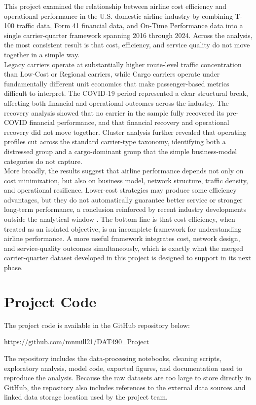 \documentclass[11pt, letterpaper]{article}
\begin{document}
This project examined the relationship between airline cost efficiency and operational performance in the U.S. domestic airline industry by combining T-100 traffic data, Form 41 financial data, and On-Time Performance data into a single carrier-quarter framework spanning 2016 through 2024. Across the analysis, the most consistent result is that cost, efficiency, and service quality do not move together in a simple way.\\
\indent Legacy carriers operate at substantially higher route-level traffic concentration than Low-Cost or Regional carriers, while Cargo carriers operate under fundamentally different unit economics that make passenger-based metrics difficult to interpret. The COVID-19 period represented a clear structural break, affecting both financial and operational outcomes across the industry. The recovery analysis showed that no carrier in the sample fully recovered its pre-COVID financial performance, and that financial recovery and operational recovery did not move together. Cluster analysis further revealed that operating profiles cut across the standard carrier-type taxonomy, identifying both a distressed group and a cargo-dominant group that the simple business-model categories do not capture.\\
\indent More broadly, the results suggest that airline performance depends not only on cost minimization, but also on business model, network structure, traffic density, and operational resilience. Lower-cost strategies may produce some efficiency advantages, but they do not automatically guarantee better service or stronger long-term performance, a conclusion reinforced by recent industry developments outside the analytical window \cite{spirit_shutdown2026}. The bottom line is that cost efficiency, when treated as an isolated objective, is an incomplete framework for understanding airline performance. A more useful framework integrates cost, network design, and service-quality outcomes simultaneously, which is exactly what the merged carrier-quarter dataset developed in this project is designed to support in its next phase.
\clearpage
{}



\clearpage
\appendix
\section{Project Code}

The project code is available in the GitHub repository below:

\begin{center}
\url{https://github.com/mnmill21/DAT490_Project}
\end{center}

The repository includes the data-processing notebooks, cleaning scripts, exploratory analysis, model code, exported figures, and documentation used to reproduce the analysis. Because the raw datasets are too large to store directly in GitHub, the repository also includes references to the external data sources and linked data storage location used by the project team.
\end{document}
